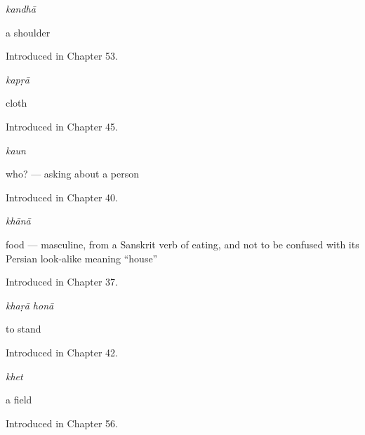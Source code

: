 \noindent\begin{minipage}[t]{\linewidth}
\raggedright
\textbf{}\enspace\emph{kandhā}\par
\small a shoulder\par
\footnotesize Introduced in Chapter 53.
\end{minipage}\par\medskip

\noindent\begin{minipage}[t]{\linewidth}
\raggedright
\textbf{}\enspace\emph{kapṛā}\par
\small cloth\par
\footnotesize Introduced in Chapter 45.
\end{minipage}\par\medskip

\noindent\begin{minipage}[t]{\linewidth}
\raggedright
\textbf{}\enspace\emph{kaun}\par
\small who? — asking about a person\par
\footnotesize Introduced in Chapter 40.
\end{minipage}\par\medskip

\noindent\begin{minipage}[t]{\linewidth}
\raggedright
\textbf{}\enspace\emph{khānā}\par
\small food — masculine, from a Sanskrit verb of eating, and not to be confused with its Persian look-alike meaning \textquotedblleft{}house\textquotedblright{}\par
\footnotesize Introduced in Chapter 37.
\end{minipage}\par\medskip

\noindent\begin{minipage}[t]{\linewidth}
\raggedright
\textbf{ }\enspace\emph{khaṛā honā}\par
\small to stand\par
\footnotesize Introduced in Chapter 42.
\end{minipage}\par\medskip

\noindent\begin{minipage}[t]{\linewidth}
\raggedright
\textbf{}\enspace\emph{khet}\par
\small a field\par
\footnotesize Introduced in Chapter 56.
\end{minipage}\par\medskip

